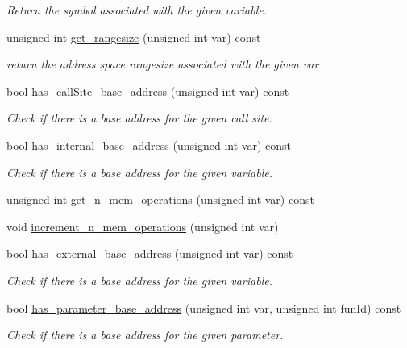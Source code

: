 \begin{DoxyCompactItemize}
\begin{DoxyCompactList}\small\item\em Return the symbol associated with the given variable. \end{DoxyCompactList}\item 
unsigned int \hyperlink{classmemory_accb255d35a6b3e1d93b5f38b9459b52b}{get\+\_\+rangesize} (unsigned int var) const
\begin{DoxyCompactList}\small\item\em return the address space rangesize associated with the given var \end{DoxyCompactList}\item 
bool \hyperlink{classmemory_a4ded4a834b5c7c70d1f7c83117d4c774}{has\+\_\+call\+Site\+\_\+base\+\_\+address} (unsigned int var) const
\begin{DoxyCompactList}\small\item\em Check if there is a base address for the given call site. \end{DoxyCompactList}\item 
bool \hyperlink{classmemory_a7008ca7ac0edcff1f6bece9751e46eac}{has\+\_\+internal\+\_\+base\+\_\+address} (unsigned int var) const
\begin{DoxyCompactList}\small\item\em Check if there is a base address for the given variable. \end{DoxyCompactList}\item 
unsigned int \hyperlink{classmemory_a94c1ee081f754ed454af2fc6729072d0}{get\+\_\+n\+\_\+mem\+\_\+operations} (unsigned int var) const
\item 
void \hyperlink{classmemory_a7115d45a81bee175e0e55a71ea92d3d9}{increment\+\_\+n\+\_\+mem\+\_\+operations} (unsigned int var)
\item 
bool \hyperlink{classmemory_a25b6c76946f47b674ad6d63efc48fd4d}{has\+\_\+external\+\_\+base\+\_\+address} (unsigned int var) const
\begin{DoxyCompactList}\small\item\em Check if there is a base address for the given variable. \end{DoxyCompactList}\item 
bool \hyperlink{classmemory_af2a8ffe8b46caad910fa15fd4b682fed}{has\+\_\+parameter\+\_\+base\+\_\+address} (unsigned int var, unsigned int fun\+Id) const
\begin{DoxyCompactList}\small\item\em Check if there is a base address for the given parameter. \end{DoxyCompactList}\item 

\end{DoxyCompactItemize}
